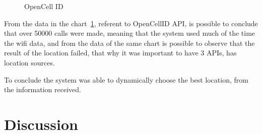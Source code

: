 \begin{figure}[htbp]
  \centering
  \caption{OpenCell ID}
  \label{fig:OpennCellID_chart}
\end{figure}




From the data  in the chart~\ref{fig:OpennCellID_chart}, referent to OpenCellID API, is possible to conclude that over 50000 calls were made, meaning that the system used much of the time the wifi data, and from the data of the same chart is possible to observe that the result of the location failed, that why it was important to have 3 APIs, has location sources.

To conclude the system was able to dynamically choose the best location, from the information received.


\section{Discussion}
\label{sec:Discussion}

